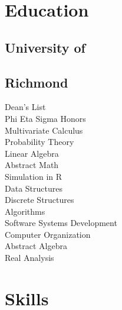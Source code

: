 \documentclass{resume}
\begin{document}

\bigskip

%
%

\begin{minipage}[t]{0.33\textwidth}


\section{Education}

\subsection{University of}
\subsection{Richmond}
Dean's List\\
Phi Eta Sigma Honors \\
{}
Multivariate Calculus\\
Probability Theory \\
Linear Algebra \\
Abstract Math\\
Simulation in R\\
Data Structures\\
Discrete Structures\\
Algorithms\\
Software Systems Development\\
Computer Organization\\
Abstract Algebra\\
Real Analysis\\
\sectionsep



\section{Skills}


\end{minipage}
\end{document}
